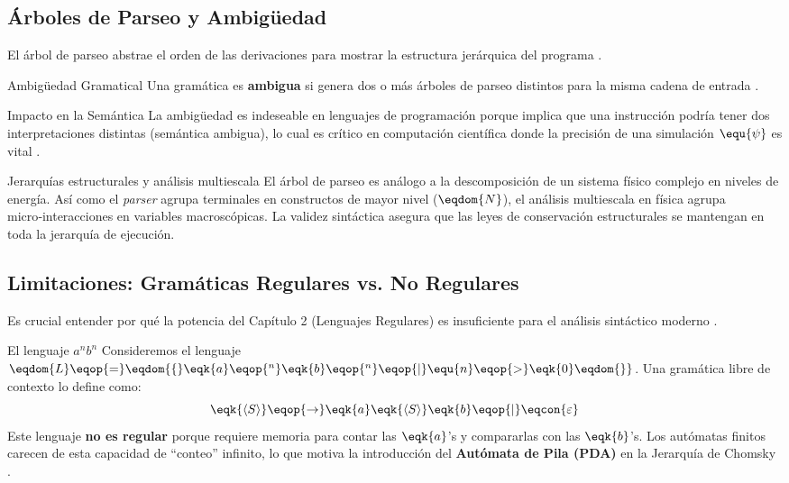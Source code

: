 \subsection{Árboles de Parseo y Ambigüedad}

El árbol de parseo abstrae el orden de las derivaciones para mostrar la estructura jerárquica del programa \cite{aho2006compilers,sipser2012introduction}.

\begin{definicion}{Ambigüedad Gramatical}
Una gramática es \textbf{ambigua} si genera dos o más árboles de parseo distintos para la misma cadena de entrada \cite{sipser2012introduction}.
\end{definicion}

\begin{observacion}{Impacto en la Semántica}
La ambigüedad es indeseable en lenguajes de programación porque implica que una instrucción podría tener dos interpretaciones distintas (semántica ambigua), lo cual es crítico en computación científica donde la precisión de una simulación $\equ{\psi}$ es vital \cite{aho2006compilers}.
\end{observacion}

\begin{fisicaconexion}{Jerarquías estructurales y análisis multiescala}
El árbol de parseo es análogo a la descomposición de un sistema físico complejo en niveles de energía. Así como el \textit{parser} agrupa terminales en constructos de mayor nivel ($\eqdom{N}$), el análisis multiescala en física agrupa micro‑interacciones en variables macroscópicas. La validez sintáctica asegura que las leyes de conservación estructurales se mantengan en toda la jerarquía de ejecución.
\end{fisicaconexion}

\subsection{Limitaciones: Gramáticas Regulares vs. No Regulares}

Es crucial entender por qué la potencia del Capítulo 2 (Lenguajes Regulares) es insuficiente para el análisis sintáctico moderno \cite{sipser2012introduction}.

\begin{ejemplo}{El lenguaje $a^n b^n$}
Consideremos el lenguaje $\eqdom{L} \eqop{=} \eqdom{\{} \eqk{a}\eqop{^n} \eqk{b}\eqop{^n} \eqop{\mid} \equ{n} \eqop{>} \eqk{0} \eqdom{\}}$. Una gramática libre de contexto lo define como:
\[ \eqk{\langle S \rangle} \eqop{\rightarrow} \eqk{a} \eqk{\langle S \rangle} \eqk{b} \eqop{\mid} \eqcon{\varepsilon} \]
Este lenguaje \textbf{no es regular} porque requiere memoria para contar las $\eqk{a}$'s y compararlas con las $\eqk{b}$'s. Los autómatas finitos carecen de esta capacidad de “conteo” infinito, lo que motiva la introducción del \textbf{Autómata de Pila (PDA)} en la Jerarquía de Chomsky \cite{sipser2012introduction}.
\end{ejemplo}

